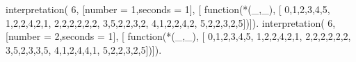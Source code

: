 interpretation( 6, [number = 1,seconds = 1], [
    function(*(_,_), [
        0,1,2,3,4,5,
        1,2,2,4,2,1,
        2,2,2,2,2,2,
        3,5,2,2,3,2,
        4,1,2,2,4,2,
        5,2,2,3,2,5])]).
interpretation( 6, [number = 2,seconds = 1], [
    function(*(_,_), [
        0,1,2,3,4,5,
        1,2,2,4,2,1,
        2,2,2,2,2,2,
        3,5,2,3,3,5,
        4,1,2,4,4,1,
        5,2,2,3,2,5])]).
